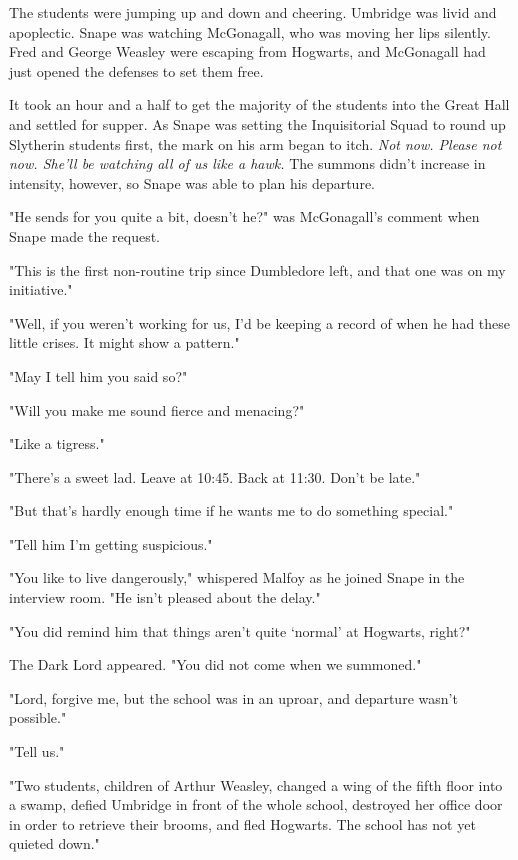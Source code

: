 The students were jumping up and down and cheering. Umbridge was livid and apoplectic. Snape was watching McGonagall, who was moving her lips silently. Fred and George Weasley were escaping from Hogwarts, and McGonagall had just opened the defenses to set them free.

It took an hour and a half to get the majority of the students into the Great Hall and settled for supper. As Snape was setting the Inquisitorial Squad to round up Slytherin students first, the mark on his arm began to itch. \emph{Not now. Please not now. She'll be watching all of us like a hawk.} The summons didn't increase in intensity, however, so Snape was able to plan his departure.

"He sends for you quite a bit, doesn't he?" was McGonagall's comment when Snape made the request.

"This is the first non-routine trip since Dumbledore left, and that one was on my initiative."

"Well, if you weren't working for us, I'd be keeping a record of when he had these little crises. It might show a pattern."

"May I tell him you said so?"

"Will you make me sound fierce and menacing?"

"Like a tigress."

"There's a sweet lad. Leave at 10:45. Back at 11:30. Don't be late."

"But that's hardly enough time if he wants me to do something special."

"Tell him I'm getting suspicious."

\sbreak

"You like to live dangerously," whispered Malfoy as he joined Snape in the interview room. "He isn't pleased about the delay."

"You did remind him that things aren't quite `normal' at Hogwarts, right?"

The Dark Lord appeared. "You did not come when we summoned."

"Lord, forgive me, but the school was in an uproar, and departure wasn't possible."

"Tell us."

"Two students, children of Arthur Weasley, changed a wing of the fifth floor into a swamp, defied Umbridge in front of the whole school, destroyed her office door in order to retrieve their brooms, and fled Hogwarts. The school has not yet quieted down."

